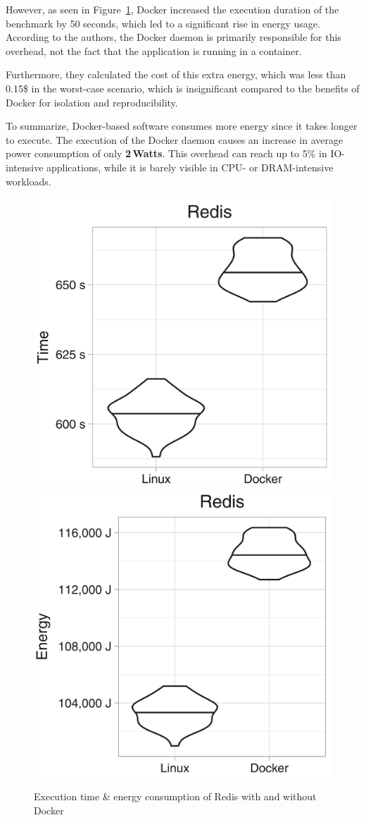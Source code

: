 However, as seen in Figure~\ref{fig:docker_reddis}, Docker increased the execution duration of the benchmark by 50 seconds, which led to a significant rise in energy usage.
According to the authors, the Docker daemon is primarily responsible for this overhead, not the fact that the application is running in a container.


Furthermore, they calculated the cost of this extra energy, which was less than 0.15\$ in the worst-case scenario, which is insignificant compared to the benefits of Docker for isolation and reproducibility.

To summarize, Docker-based software consumes more energy since it takes longer to execute.
The execution of the Docker daemon causes an increase in average power consumption of only \textbf{2\,Watts}.
This overhead can reach up to 5\% in IO-intensive applications, while it is barely visible in CPU- or DRAM-intensive workloads.

\begin{figure}[!bht]
    \includegraphics[width=.5\linewidth]{imgs/docker_vs_vm_energy_paper/reddis_time}
    \includegraphics[width=.5\linewidth]{imgs/docker_vs_vm_energy_paper/reddis_energy}
    \caption{Execution time \& energy consumption of Redis with and without Docker~\cite{eddie_antonio_santos_how}}\label{fig:docker_reddis}
\end{figure}

